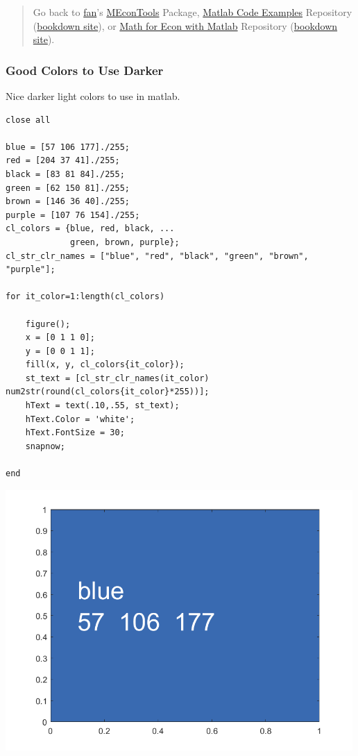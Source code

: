 \documentclass[
]{book}
\begin{document}
\begin{quote}
Go back to \href{http://fanwangecon.github.io/}{fan}'s \href{https://fanwangecon.github.io/MEconTools/}{MEconTools} Package, \href{https://fanwangecon.github.io/M4Econ/}{Matlab Code Examples} Repository (\href{https://fanwangecon.github.io/M4Econ/bookdown}{bookdown site}), or \href{https://fanwangecon.github.io/Math4Econ/}{Math for Econ with Matlab} Repository (\href{https://fanwangecon.github.io/Math4Econ/bookdown}{bookdown site}).
\end{quote}

\hypertarget{good-colors-to-use-darker}{%
\subsubsection{Good Colors to Use Darker}\label{good-colors-to-use-darker}}

Nice darker light colors to use in matlab.

\begin{verbatim}
close all

blue = [57 106 177]./255;
red = [204 37 41]./255;
black = [83 81 84]./255;
green = [62 150 81]./255;
brown = [146 36 40]./255;
purple = [107 76 154]./255;
cl_colors = {blue, red, black, ...
             green, brown, purple};
cl_str_clr_names = ["blue", "red", "black", "green", "brown", "purple"];

for it_color=1:length(cl_colors)
    
    figure();
    x = [0 1 1 0];
    y = [0 0 1 1];
    fill(x, y, cl_colors{it_color});
    st_text = [cl_str_clr_names(it_color) num2str(round(cl_colors{it_color}*255))];
    hText = text(.10,.55, st_text);
    hText.Color = 'white';
    hText.FontSize = 30; 
    snapnow;
    
end
\end{verbatim}

\includegraphics[width=5.20833in,height=\textheight]{img/fs_color_images/figure_0.png}
\end{document}
